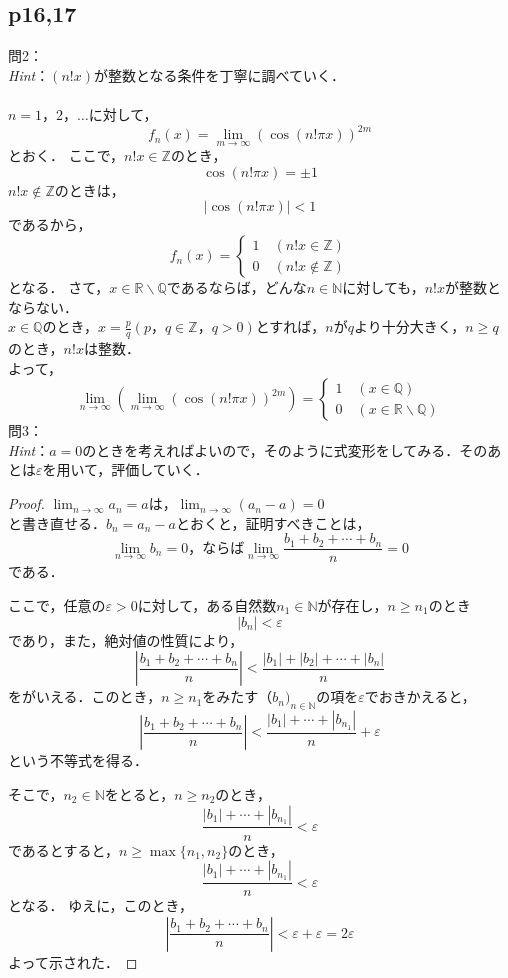 \documentclass[dvipdfmx,uplatex,11pt]{jsarticle}
\begin{document}
\subsection{p16,17}
%
\noindent
問2：
\\
\textsl{Hint}：$(n!x)$が整数となる条件を丁寧に調べていく．\\
\dotfill
%
% 
%
\\
$n=1，2，\ldots$に対して，
\[
	f_{n} (x)=\lim_{m \to \infty} (\cos (n! \pi x)) ^{2m}
\]
とおく．
ここで，$n!x \in \mathbb{Z}$のとき，
\[
	\cos (n! \pi x)=\pm 1
\]
$n!x \notin \mathbb{Z}$のときは，
\[
	|\cos (n! \pi x)|<1
\]
であるから，
\[
	f_{n} (x)=
	\begin{cases}
		1 \quad(n!x \in \mathbb{Z}) \\
		0 \quad (n!x \notin \mathbb{Z})
	\end{cases}
\]
となる．
さて，$x \in \mathbb{R} \backslash\mathbb{Q}$であるならば，どんな$n \in \mathbb{N}$に対しても，$n! x$が整数とならない．\\
$x \in \mathbb{Q}$のとき，$ x=\frac{p}{q}(p，q \in \mathbb{Z}，q>0)$とすれば，$n$が$q$より十分大きく，$n \ge q$のとき，$n!x$は整数．\\
よって，
\[
	\lim_{n \to \infty} \left( \lim_{m \to \infty} (\cos (n! \pi x)) ^{2m} \right)=
	\begin{cases}
		1 \quad (x \in \mathbb{Q}) \\
		0  \quad (x \in \mathbb{R} \backslash \mathbb{Q})
	\end{cases}
\]
%
\newpage
%
\noindent
問3：
\\
\textsl{Hint}：$a=0$のときを考えればよいので，そのように式変形をしてみる．そのあとは$\varepsilon$を用いて，評価していく．\\
\dotfill
%
\begin{leftbar}
	\begin{proof}
		$\lim_{n \to \infty} a_n= a$は，$ \lim_{n \to \infty} (a_n - a)= 0$\\
		と書き直せる．$b_n = a_n -a$とおくと，証明すべきことは，
		\[
			\lim_{n \to \infty} b_n=0，ならば \lim_{n \to \infty} \frac{b_1 + b_2 + \cdots +b_n}{n} = 0
		\]
		である．\par
		ここで，任意の$\varepsilon > 0$に対して，ある自然数$n_1 \in \mathbb{N}$が存在し，$n \ge n_1$のとき
		\[
			|b_n|<\varepsilon
		\]
		であり，また，絶対値の性質により，
		\[
			\left| \frac{b_1 + b_2 + \cdots +b_n}{n} \right| <\frac{|b_1| + |b_2| + \cdots +|b_n|}{n}
		\]
		をがいえる．このとき，$n \ge n_1$をみたす$（b_n)_{n \in \mathbb{N}}$の項を$\varepsilon$でおきかえると，
		\[
			\left| \frac{b_1 + b_2 + \cdots +b_n}{n} \right| < \frac{|b_1|+ \cdots + |b_{n_1}|}{n} +\varepsilon
		\]
		という不等式を得る．\par
		そこで，$n_2 \in \mathbb{N}$をとると，$n \ge n_2$のとき，
		\[
			\frac{|b_1|+ \cdots + |b_{n_1}|}{n} <\varepsilon
		\]
		であるとすると，$n \ge \max \{ n_1,n_2\}$のとき，
		\[
			\frac{|b_1|+ \cdots + |b_{n_1}|}{n} < \varepsilon
		\]
		となる．
		ゆえに，このとき，
		\[
			\left| \frac{ b_1 + b_2 + \cdots +b_n}{n} \right|　< \varepsilon+\varepsilon=2\varepsilon
		\]
		よって示された．
	\end{proof}
\end{leftbar}
\end{document}
